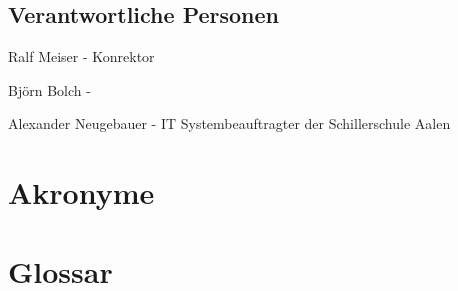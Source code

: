 \documentclass[12pt, twoside, a4paper, ngerman]{article}
\begin{document}
\begin{appendix}
\subsection{Verantwortliche Personen}\label{subsec:Verantwortliche Personen}

Ralf Meiser - Konrektor

Björn Bolch - 

Alexander Neugebauer - IT Systembeauftragter der Schillerschule Aalen

\newpage
\section{Akronyme}



\newpage
\section{Glossar}
\label{anhang:Glossar}
\printglossary[title={}] 

\end{appendix}

\newpage
{}
\listoffigures
\cleardoublepage

\newpage
{}
\listoftables
\cleardoublepage

\newpage
{}
\lstlistoflistings
\cleardoublepage

\newpage
{}
	  


\end{document}
